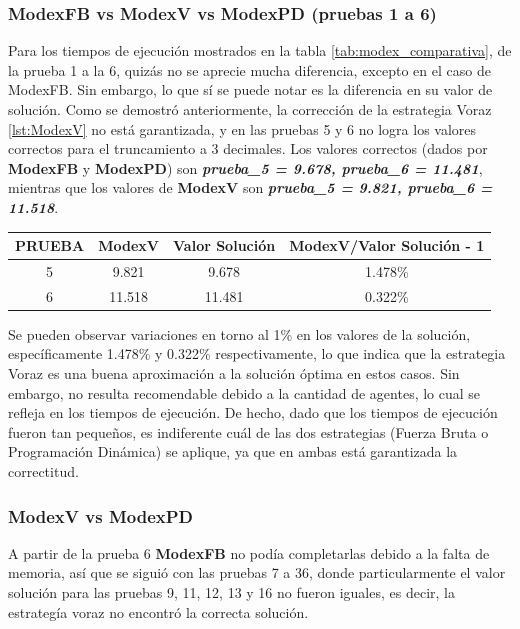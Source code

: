 \documentclass[letterpaper,10pt]{article}
\begin{document}
\subsubsection{ModexFB vs ModexV vs ModexPD (pruebas 1 a 6)}

Para los tiempos de ejecución mostrados en la tabla \ref{tab:modex_comparativa}, de la prueba 1 a la 6, quizás no se aprecie mucha diferencia, excepto en el caso de ModexFB. Sin embargo, lo que sí se puede notar es la diferencia en su valor de solución. Como se demostró anteriormente, la corrección de la estrategia Voraz \ref{lst:ModexV} no está garantizada, y en las pruebas 5 y 6 no logra los valores correctos para el truncamiento a 3 decimales. Los valores correctos (dados por \textbf{ModexFB} y \textbf{ModexPD}) son \textit{\textbf{prueba\_5 = 9.678, prueba\_6 = 11.481}}, mientras que los valores de \textbf{ModexV} son \textit{\textbf{prueba\_5 = 9.821, prueba\_6 = 11.518}}.

\begin{table}[H]
  \centering
  \begin{tabular}{|c|c|c|c|}
    \hline
    \textbf{PRUEBA} & \textbf{ModexV} & \textbf{Valor Solución} & \textbf{ModexV/Valor Solución - 1} \\
    \hline
    5 & 9.821 & 9.678 & 1.478\% \\
    6 & 11.518 & 11.481 & 0.322\% \\
    \hline    
  \end{tabular}  
\end{table}

Se pueden observar variaciones en torno al 1\% en los valores de la solución, específicamente 1.478\% y 0.322\% respectivamente, lo que indica que la estrategia Voraz es una buena aproximación a la solución óptima en estos casos. Sin embargo, no resulta recomendable debido a la cantidad de agentes, lo cual se refleja en los tiempos de ejecución. De hecho, dado que los tiempos de ejecución fueron tan pequeños, es indiferente cuál de las dos estrategias (Fuerza Bruta o Programación Dinámica) se aplique, ya que en ambas está garantizada la correctitud.

\subsubsection{ModexV vs ModexPD}
A partir de la prueba 6 \textbf{ModexFB} no podía completarlas debido a la falta de memoria, así que se siguió con las pruebas 7 a 36, donde particularmente el valor solución para las pruebas 9, 11, 12, 13 y 16 no fueron iguales, es decir, la estrategía voraz no encontró la correcta solución.
\end{document}

